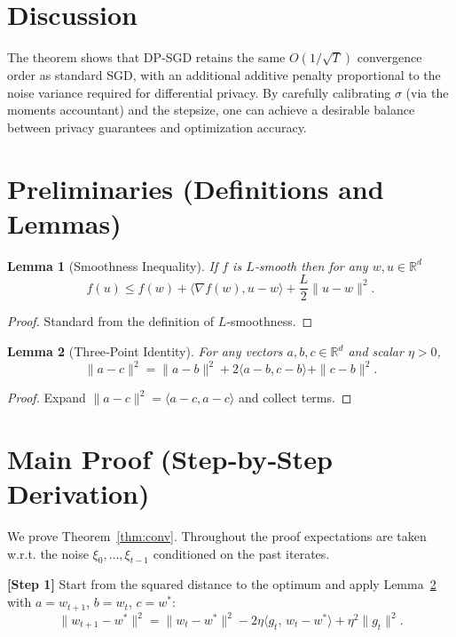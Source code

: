 \documentclass{article}
\newtheorem{lemma}{Lemma}
\newcommand{\R}{\mathbb{R}}
\begin{document}
\section*{Discussion}
The theorem shows that DP‑SGD retains the same $O(1/\sqrt{T})$ convergence order as standard SGD, with an additional additive penalty proportional to the noise variance required for differential privacy. By carefully calibrating $\sigma$ (via the moments accountant) and the stepsize, one can achieve a desirable balance between privacy guarantees and optimization accuracy.

\section*{Preliminaries (Definitions and Lemmas)}
\begin{lemma}[Smoothness Inequality]\label{lem:smooth}
If $f$ is $L$‑smooth then for any $w,u\in\R^{d}$
\[
f(u)\le f(w)+\langle\nabla f(w),u-w\rangle+\frac{L}{2}\|u-w\|^{2}.
\]
\end{lemma}
\begin{proof}
Standard from the definition of $L$‑smoothness. \qedhere
\end{proof}

\begin{lemma}[Three‑Point Identity]\label{lem:three}
For any vectors $a,b,c\in\R^{d}$ and scalar $\eta>0$,
\[
\|a-c\|^{2}= \|a-b\|^{2}+2\langle a-b,c-b\rangle+\|c-b\|^{2}.
\]
\end{lemma}
\begin{proof}
Expand $\|a-c\|^{2}=\langle a-c,a-c\rangle$ and collect terms. \qedhere
\end{proof}

\section*{Main Proof (Step‑by‑Step Derivation)}
We prove Theorem~\ref{thm:conv}.  Throughout the proof expectations are taken w.r.t. the noise $\xi_0,\dots,\xi_{t-1}$ conditioned on the past iterates.

\bigskip
\noindent\textbf{[Step 1]}  Start from the squared distance to the optimum and apply Lemma~\ref{lem:three} with $a=w_{t+1}$, $b=w_t$, $c=w^{*}$:
\[
\|w_{t+1}-w^{*}\|^{2}
= \|w_t-w^{*}\|^{2}
-2\eta\langle g_t,\,w_t-w^{*}\rangle
+\eta^{2}\|g_t\|^{2}.
\tag{3}
\]
\end{document}
